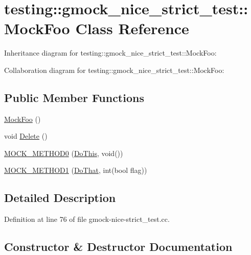 \hypertarget{classtesting_1_1gmock__nice__strict__test_1_1_mock_foo}{}\section{testing\+:\+:gmock\+\_\+nice\+\_\+strict\+\_\+test\+:\+:Mock\+Foo Class Reference}
\label{classtesting_1_1gmock__nice__strict__test_1_1_mock_foo}


Inheritance diagram for testing\+:\+:gmock\+\_\+nice\+\_\+strict\+\_\+test\+:\+:Mock\+Foo\+:


Collaboration diagram for testing\+:\+:gmock\+\_\+nice\+\_\+strict\+\_\+test\+:\+:Mock\+Foo\+:
\subsection*{Public Member Functions}
\begin{DoxyCompactItemize}
\item 
\hyperlink{classtesting_1_1gmock__nice__strict__test_1_1_mock_foo_a43a103497aa475d4b1700f5116b35ef3}{Mock\+Foo} ()
\item 
void \hyperlink{classtesting_1_1gmock__nice__strict__test_1_1_mock_foo_a7bdec6a6353e4396d551dbf8f2beac54}{Delete} ()
\item 
\hyperlink{classtesting_1_1gmock__nice__strict__test_1_1_mock_foo_a14ee661ebc461096824e876a9308840e}{M\+O\+C\+K\+\_\+\+M\+E\+T\+H\+O\+D0} (\hyperlink{classtesting_1_1gmock__nice__strict__test_1_1_foo_a79a3cdbd8d9d9f6bc87580563b0d7cec}{Do\+This}, void())
\item 
\hyperlink{classtesting_1_1gmock__nice__strict__test_1_1_mock_foo_a3a7bfcf303a2c8578db900c9525b02a1}{M\+O\+C\+K\+\_\+\+M\+E\+T\+H\+O\+D1} (\hyperlink{classtesting_1_1gmock__nice__strict__test_1_1_foo_a8527a459b03f333a809a3376311a9f8b}{Do\+That}, int(bool flag))
\end{DoxyCompactItemize}


\subsection{Detailed Description}


Definition at line 76 of file gmock-\/nice-\/strict\+\_\+test.\+cc.



\subsection{Constructor \& Destructor Documentation}
